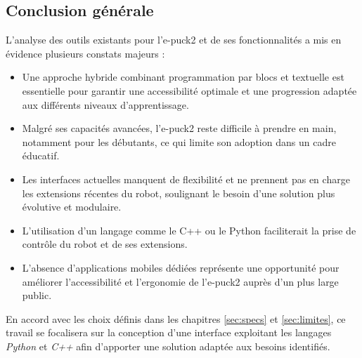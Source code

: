 \subsection{Conclusion générale} \label{sec:conclusion_recherches}

L’analyse des outils existants pour l’e-puck2 et de ses fonctionnalités a mis en évidence plusieurs constats majeurs :  

\begin{itemize}
    \item Une approche hybride combinant programmation par blocs et textuelle est essentielle pour garantir une accessibilité optimale et une progression adaptée aux différents niveaux d’apprentissage.  

    \item Malgré ses capacités avancées, l’e-puck2 reste difficile à prendre en main, notamment pour les débutants, ce qui limite son adoption dans un cadre éducatif.  

    \item Les interfaces actuelles manquent de flexibilité et ne prennent pas en charge les extensions récentes du robot, soulignant le besoin d’une solution plus évolutive et modulaire. 

    \item L’utilisation d’un langage comme le C++ ou le Python faciliterait la prise de contrôle du robot et de ses extensions.

    \item L’absence d’applications mobiles dédiées représente une opportunité pour améliorer l’accessibilité et l’ergonomie de l’e-puck2 auprès d’un plus large public.  
\end{itemize}

En accord avec les choix définis dans les chapitres \ref{sec:specs} et \ref{sec:limites}, ce travail se focalisera sur la conception d’une interface exploitant les langages \textit{Python} et \textit{C++} afin d’apporter une solution adaptée aux besoins identifiés.
